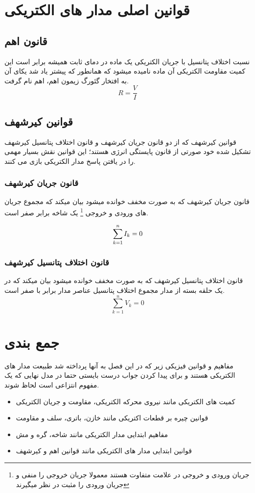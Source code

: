 \section{قوانین اصلی مدار های الکتریکی}
\subsection{قانون اهم}
\label{formula}

نسبت اختلاف پتانسیل با جریان الکتریکی یک ماده در دمای ثابت همیشه برابر است این کمیت مقاومت الکتریکی آن ماده نامیده میشود که همانطور که پیشتر یاد شد یکای آن به افتخار گئورگ زیمون اهم، اهم نام گرفت.
\begin{equation}\label{eq:ohm}
	R=\frac{V}{I}
\end{equation}


\subsection{قوانین کیرشهف}
قوانین کیرشهف که از دو قانون جریان کیرشهف
و قانون اختلاف پتانسیل کیرشهف
تشکیل شده خود صورتی از قانون پایستگی انرژی هستند؛
این قوانین نقش بسیار مهمی را در یافتن پاسخ مدار الکتریکی بازی می کنند.
\subsubsection{قانون جریان کیرشهف}
قانون جریان کیرشهف که به صورت مخفف
خوانده میشود بیان میکند که مجموع جریان های ورودی و خروجی
\footnote{	جریان ورودی و خروجی در علامت متفاوت هستند معمولا جریان خروجی را منفی و جریان ورودی را مثبت در نظر میگیرند	}
 یک شاخه برابر صفر است.
 \cite{Mahoney15}
 
\begin{equation}\label{eq:kcl}
	\sum_{k=1}^{n}I_k\index{k} = 0
\end{equation}
\subsubsection{قانون اختلاف پتانسیل کیرشهف}
قانون اختلاف پتانسیل کیرشهف که به صورت مخفف
خوانده میشود بیان میکند که در یک حلقه بسته از مدار مجموع اختلاف پتانسیل عناصر مدار برابر با صفر است.
\cite{Mahoney15}
\begin{equation}\label{eq:kvl}
	\sum_{k=1}^{n}V_k = 0
\end{equation}

\section{جمع بندی}
مفاهیم  و قوانین فیزیکی زیر که در این فصل به آنها پرداخته شد طبیعت مدار های الکتریکی هستند و برای پیدا کردن جواب درست بایستی حتما در مدل نهایی که یک مفهوم انتزاعی است لحاظ شوند.
\begin{itemize}
	\item
	کمیت های الکتریکی مانند نیروی محرکه الکتریکی، مقاومت و جریان الکتریکی
	\item
	قوانین چیره بر قطعات اکتریکی مانند خازن، باتری، سلف و مقاومت
	\item
	مفاهیم ابتدایی مدار الکتریکی مانند شاخه، گره و مش
	\item
	قوانین ابتدایی مدار های الکتریکی مانند قوانین اهم و کیرشهف
	
\end{itemize}